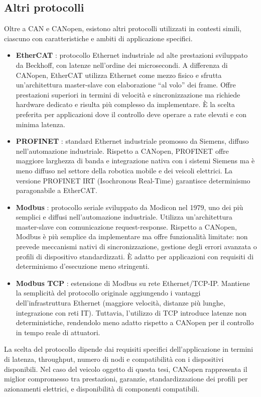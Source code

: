 \subsection{Altri protocolli}
Oltre a CAN e CANopen, esistono altri protocolli utilizzati in contesti simili, ciascuno con caratteristiche e ambiti di applicazione specifici.

\begin{itemize}
    \item \textbf{EtherCAT} \cite{iec61158ethercat}: protocollo Ethernet industriale ad alte prestazioni sviluppato da Beckhoff, con latenze nell'ordine dei microsecondi. A differenza di CANopen, EtherCAT utilizza Ethernet come mezzo fisico e sfrutta un'architettura master-slave con elaborazione ``al volo'' dei frame. Offre prestazioni superiori in termini di velocità e sincronizzazione ma richiede hardware dedicato e risulta più complesso da implementare. È la scelta preferita per applicazioni dove il controllo deve operare a rate elevati e con minima latenza.

    \item \textbf{PROFINET} \cite{iec61158profinet}: standard Ethernet industriale promosso da Siemens, diffuso nell'automazione industriale. Rispetto a CANopen, PROFINET offre maggiore larghezza di banda e integrazione nativa con i sistemi Siemens ma è meno diffuso nel settore della robotica mobile e dei veicoli elettrici. La versione PROFINET IRT (Isochronous Real-Time) garantisce determinismo paragonabile a EtherCAT.

    \item \textbf{Modbus} \cite{modbus_spec}: protocollo seriale sviluppato da Modicon nel 1979, uno dei più semplici e diffusi nell'automazione industriale. Utilizza un'architettura master-slave con comunicazione request-response. Rispetto a CANopen, Modbus è più semplice da implementare ma offre funzionalità limitate: non prevede meccanismi nativi di sincronizzazione, gestione degli errori avanzata o profili di dispositivo standardizzati. È adatto per applicazioni con requisiti di determinismo d'esecuzione meno stringenti.

    \item \textbf{Modbus TCP} \cite{modbustcp_spec}: estensione di Modbus su rete Ethernet/TCP-IP. Mantiene la semplicità del protocollo originale aggiungendo i vantaggi dell'infrastruttura Ethernet (maggiore velocità, distanze più lunghe, integrazione con reti IT). Tuttavia, l'utilizzo di TCP introduce latenze non deterministiche, rendendolo meno adatto rispetto a CANopen per il controllo in tempo reale di attuatori.
\end{itemize}

La scelta del protocollo dipende dai requisiti specifici dell'applicazione in termini di latenza, throughput, numero di nodi e compatibilità con i dispositivi disponibili. Nel caso del veicolo oggetto di questa tesi, CANopen rappresenta il miglior compromesso tra prestazioni, garanzie, standardizzazione dei profili per azionamenti elettrici, e disponibilità di componenti compatibili.
